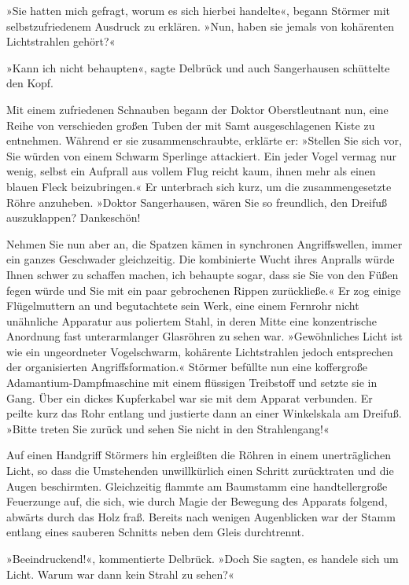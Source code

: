 »Sie hatten mich gefragt, worum es sich hierbei handelte«, begann
Störmer mit selbstzufriedenem Ausdruck zu erklären. »Nun, haben sie
jemals von kohärenten Lichtstrahlen gehört?«

»Kann ich nicht behaupten«, sagte Delbrück und auch Sangerhausen
schüttelte den Kopf.

Mit einem zufriedenen Schnauben begann der Doktor Oberstleutnant
nun, eine Reihe von verschieden großen Tuben der mit Samt
ausgeschlagenen Kiste zu entnehmen. Während er sie
zusammenschraubte, erklärte er: »Stellen Sie sich vor, Sie würden
von einem Schwarm Sperlinge attackiert. Ein jeder Vogel vermag nur
wenig, selbst ein Aufprall aus vollem Flug reicht kaum, ihnen mehr
als einen blauen Fleck beizubringen.« Er unterbrach sich kurz, um
die zusammengesetzte Röhre anzuheben. »Doktor Sangerhausen, wären
Sie so freundlich, den Dreifuß auszuklappen? Dankeschön!

Nehmen Sie nun aber an, die Spatzen kämen in synchronen
Angriffswellen, immer ein ganzes Geschwader gleichzeitig. Die
kombinierte Wucht ihres Anpralls würde Ihnen schwer zu schaffen
machen, ich behaupte sogar, dass sie Sie von den Füßen fegen würde
und Sie mit ein paar gebrochenen Rippen zurückließe.« Er zog einige
Flügelmuttern an und begutachtete sein Werk, eine einem Fernrohr
nicht unähnliche Apparatur aus poliertem Stahl, in deren Mitte eine
konzentrische Anordnung fast unterarmlanger Glasröhren zu sehen
war. »Gewöhnliches Licht ist wie ein ungeordneter Vogelschwarm,
kohärente Lichtstrahlen jedoch entsprechen der organisierten
Angriffsformation.« Störmer befüllte nun eine koffergroße
Adamantium-Dampfmaschine mit einem flüssigen Treibstoff und setzte
sie in Gang. Über ein dickes Kupferkabel war sie mit dem Apparat
verbunden. Er peilte kurz das Rohr entlang und justierte dann an
einer Winkelskala am Dreifuß. »Bitte treten Sie zurück und sehen
Sie nicht in den Strahlengang!«

Auf einen Handgriff Störmers hin ergleißten die Röhren in einem
unerträglichen Licht, so dass die Umstehenden unwillkürlich einen
Schritt zurücktraten und die Augen beschirmten. Gleichzeitig
flammte am Baumstamm eine handtellergroße Feuerzunge auf, die sich,
wie durch Magie der Bewegung des Apparats folgend, abwärts durch
das Holz fraß. Bereits nach wenigen Augenblicken war der Stamm
entlang eines sauberen Schnitts neben dem Gleis durchtrennt.

»Beeindruckend!«, kommentierte Delbrück. »Doch Sie sagten, es
handele sich um Licht. Warum war dann kein Strahl zu sehen?«

